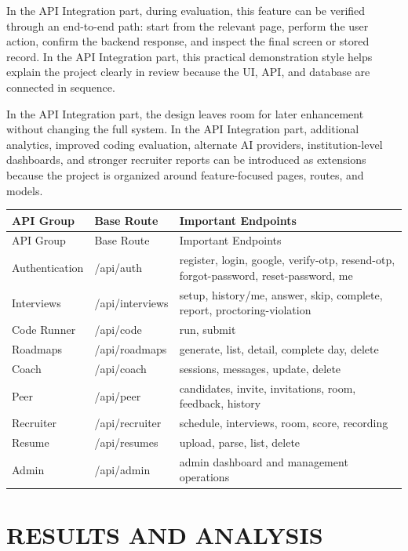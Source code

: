 \documentclass[12pt,a4paper]{report}
\begin{document}
In the API Integration part, during evaluation, this feature can be verified through an end-to-end path: start from the relevant page, perform the user action, confirm the backend response, and inspect the final screen or stored record. In the API Integration part, this practical demonstration style helps explain the project clearly in review because the UI, API, and database are connected in sequence.


In the API Integration part, the design leaves room for later enhancement without changing the full system. In the API Integration part, additional analytics, improved coding evaluation, alternate AI providers, institution-level dashboards, and stronger recruiter reports can be introduced as extensions because the project is organized around feature-focused pages, routes, and models.


\begin{longtable}{|>{\raggedright\arraybackslash}p{}|>{\raggedright\arraybackslash}p{}|>{\raggedright\arraybackslash}p{}|}
\hline
API Group & Base Route & Important Endpoints \\
\hline
\endfirsthead
\hline
API Group & Base Route & Important Endpoints \\
\hline
\endhead
Authentication & /api/auth & register, login, google, verify-otp, resend-otp, forgot-password, reset-password, me \\
\hline
Interviews & /api/interviews & setup, history/me, answer, skip, complete, report, proctoring-violation \\
\hline
Code Runner & /api/code & run, submit \\
\hline
Roadmaps & /api/roadmaps & generate, list, detail, complete day, delete \\
\hline
Coach & /api/coach & sessions, messages, update, delete \\
\hline
Peer & /api/peer & candidates, invite, invitations, room, feedback, history \\
\hline
Recruiter & /api/recruiter & schedule, interviews, room, score, recording \\
\hline
Resume & /api/resumes & upload, parse, list, delete \\
\hline
Admin & /api/admin & admin dashboard and management operations \\
\hline
\end{longtable}

\chapter{RESULTS AND ANALYSIS}
\end{document}
